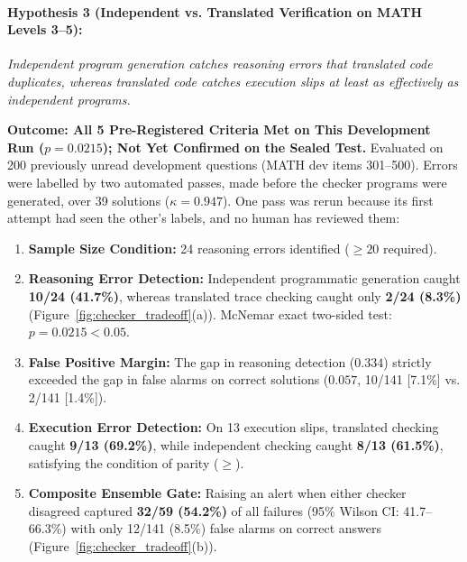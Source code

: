 \documentclass[11pt,a4paper]{article}
\begin{document}
\paragraph{Hypothesis 3 (Independent vs. Translated Verification on MATH Levels 3--5):}
\textit{Independent program generation catches reasoning errors that translated code duplicates, whereas translated code catches execution slips at least as effectively as independent programs.}

\textbf{Outcome: All 5 Pre-Registered Criteria Met on This Development Run ($p = 0.0215$); Not Yet Confirmed on the Sealed Test.}
Evaluated on 200 previously unread development questions (MATH dev items 301--500). Errors were labelled by two automated passes, made before the checker programs were generated, over 39 solutions ($\kappa = 0.947$). One pass was rerun because its first attempt had seen the other's labels, and no human has reviewed them:
\begin{enumerate}
    \item \textbf{Sample Size Condition:} 24 reasoning errors identified ($\ge 20$ required).
    \item \textbf{Reasoning Error Detection:} Independent programmatic generation caught \textbf{10/24 (41.7\%)}, whereas translated trace checking caught only \textbf{2/24 (8.3\%)} (Figure~\ref{fig:checker_tradeoff}(a)). McNemar exact two-sided test: $p = 0.0215 < 0.05$.
    \item \textbf{False Positive Margin:} The gap in reasoning detection ($0.334$) strictly exceeded the gap in false alarms on correct solutions ($0.057$, 10/141 [7.1\%] vs. 2/141 [1.4\%]).
    \item \textbf{Execution Error Detection:} On 13 execution slips, translated checking caught \textbf{9/13 (69.2\%)}, while independent checking caught \textbf{8/13 (61.5\%)}, satisfying the condition of parity ($\ge$).
    \item \textbf{Composite Ensemble Gate:} Raising an alert when either checker disagreed captured \textbf{32/59 (54.2\%)} of all failures (95\% Wilson CI: 41.7--66.3\%) with only 12/141 (8.5\%) false alarms on correct answers (Figure~\ref{fig:checker_tradeoff}(b)).
\end{enumerate}
\end{document}
